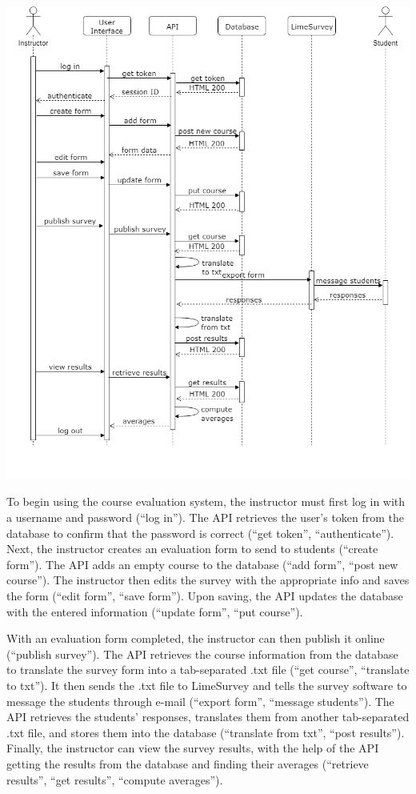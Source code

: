 \documentclass{article}
\begin{document}
\begin{center}
\label{fig:sequencediagram}
{\includegraphics[scale=.55]{images/sequence_diagram.png}}
\end{center}

\newpage

To begin using the course evaluation system, the instructor must first log in with a username and password (``log in''). The API retrieves the user's token from the database to confirm that the password is correct (``get token'', ``authenticate''). Next, the instructor creates an evaluation form to send to students (``create form''). The API adds an empty course to the database (``add form'', ``post new course''). The instructor then edits the survey with the appropriate info and saves the form (``edit form'', ``save form''). Upon saving, the API updates the database with the entered information (``update form'', ``put course'').

With an evaluation form completed, the instructor can then publish it online (``publish survey''). The API retrieves the course information from the database to translate the survey form into a tab-separated .txt file (``get course'', ``translate to txt''). It then sends the .txt file to LimeSurvey and tells the survey software to message the students through e-mail (``export form'', ``message students''). The API retrieves the students' responses, translates them from another tab-separated .txt file, and stores them into the database (``translate from txt'', ``post results''). Finally, the instructor can view the survey results, with the help of the API getting the results from the database and finding their averages (``retrieve results'', ``get results'', ``compute averages'').
\end{document}

